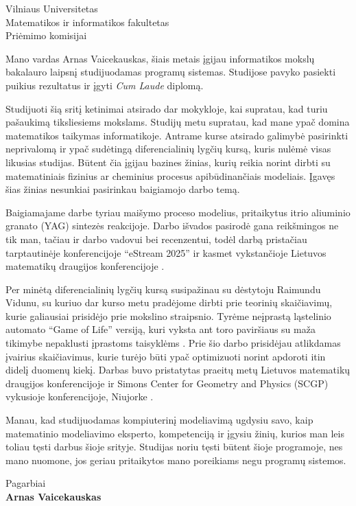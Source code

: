 \documentclass[]{VUMIFTemplateClass}
\begin{document}
\thispagestyle{empty}

\begin{flushright}
Vilniaus Universitetas \\
Matematikos ir informatikos fakultetas \\
Priėmimo komisijai
\end{flushright}

\vspace{1cm}

Mano vardas Arnas Vaicekauskas, šiais metais įgijau informatikos mokslų bakalauro laipsnį studijuodamas programų sistemas. Studijose pavyko pasiekti puikius rezultatus ir įgyti \textit{Cum Laude} diplomą.

Studijuoti šią sritį ketinimai atsirado dar mokykloje, kai supratau, kad turiu pašaukimą tiksliesiems mokslams. Studijų metu 
supratau, kad mane ypač domina matematikos taikymas informatikoje. Antrame kurse atsirado galimybė pasirinkti neprivalomą ir ypač sudėtingą diferencialinių lygčių kursą, kuris nulėmė visas likusias studijas. Būtent čia įgijau bazines žinias, kurių reikia norint dirbti su matematiniais fizinius ar cheminius procesus apibūdinančiais modeliais. Įgavęs šias žinias nesunkiai pasirinkau baigiamojo darbo temą.

Baigiamajame darbe tyriau maišymo proceso modelius, pritaikytus itrio aliuminio granato (YAG) sintezės reakcijoje. Darbo išvados pasirodė gana reikšmingos ne tik man, tačiau ir darbo vadovui bei recenzentui, todėl darbą pristačiau tarptautinėje konferencijoje \enquote{eStream 2025} ir kasmet vykstančioje Lietuvos matematikų draugijos konferencijoje \cite{LietuvosMatematikuDraugijos}.

Per minėtą diferencialinių lygčių kursą susipažinau su dėstytoju Raimundu Vidunu, su kuriuo dar kurso metu pradėjome dirbti prie teorinių skaičiavimų, kurie galiausiai prisidėjo prie mokslino straipsnio. Tyrėme neįprastą ląstelinio automato \enquote{Game of Life} versiją, kuri vyksta ant toro paviršiaus su maža tikimybe nepaklusti įprastoms taisyklėms \cite{vidunasConwaysGameLife2025}. Prie šio darbo prisidėjau atlikdamas įvairius skaičiavimus, kurie turėjo būti ypač optimizuoti norint apdoroti itin didelį duomenų kiekį. Darbas buvo pristatytas praeitų metų Lietuvos matematikų draugijos konferencijoje \cite{stikonasKONFERENCIJOSPROGRAMINISKOMITETAS2024} ir Simons Center for Geometry and Physics (SCGP) vykusioje konferencijoje, Niujorke \cite{MurmurationsArithmeticGeometry}.

Manau, kad studijuodamas kompiuterinį modeliavimą ugdysiu savo, kaip matematinio modeliavimo eksperto, kompetenciją ir įgysiu žinių, kurios man leis toliau tęsti darbus šioje srityje. Studijas noriu tęsti būtent šioje programoje, nes mano nuomone, jos geriau pritaikytos mano poreikiams negu programų sistemos.

\vspace{1em}

Pagarbiai \\
\vspace{0.5em}
\textbf{Arnas Vaicekauskas} 

\printbibliography
\end{document}
